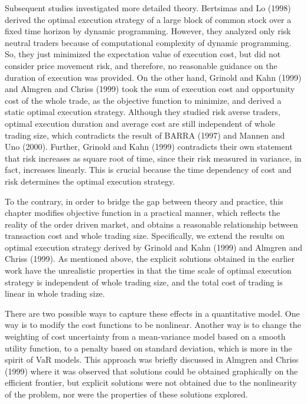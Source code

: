 Subsequent studies investigated more detailed theory.  Bertsimas and Lo (1998) derived the optimal execution strategy of a large block of common stock over a fixed time horizon by dynamic programming.  However, they analyzed only risk neutral traders because of computational complexity of dynamic programming.  So, they just minimized the expectation value of execution cost, but did not consider price movement risk, and therefore, no reasonable guidance on the duration of execution was provided.  On the other hand, Grinold and Kahn (1999) and Almgren and Chriss (1999) took the sum of execution cost and opportunity cost of the whole trade, as the objective function to minimize, and derived a static optimal execution strategy.  Although they studied risk averse traders, optimal execution duration and average cost are still independent of whole trading size, which contradicts the result of BARRA (1997) and Mannen and Uno (2000).  Further, Grinold and Kahn (1999) contradicts their own statement that risk increases as square root of time, since their risk measured in variance, in fact, increases linearly.  This is crucial because the time dependency of cost and risk determines the optimal execution strategy.

To the contrary, in order to bridge the gap between theory and practice, this chapter modifies objective function in a practical manner, which reflects the reality of the order driven market, and obtains a reasonable relationship between transaction cost and whole trading size.  Specifically, we extend the results on optimal execution strategy derived by Grinold and Kahn (1999) and Almgren and Chriss (1999).  As mentioned above, the explicit solutions obtained in the earlier work have the unrealistic properties in that the time scale of optimal execution strategy is independent of whole trading size, and the total cost of trading is linear in whole trading size. 

There are two possible ways to capture these effects in a quantitative model. One way is to modify the cost functions to be nonlinear.  Another way is to change the weighting of cost uncertainty from a mean-variance model based on a smooth utility function, to a penalty based on standard deviation, which is more in the spirit of VaR models.  This approach was briefly discussed in Almgren and Chriss (1999) where it was observed that solutions could be obtained graphically on the efficient frontier, but explicit solutions were not obtained due to the nonlinearity of the problem, nor were the properties of these solutions explored.

